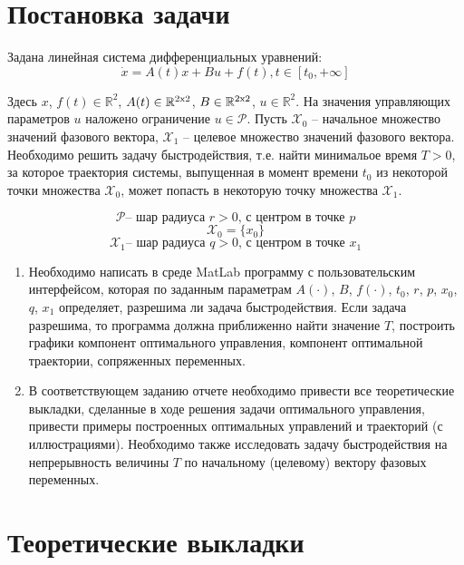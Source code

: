 \documentclass{article}
\begin{document}
\section{Постановка задачи}

    Задана линейная система дифференциальных уравнений:
    \begin{equation}
        \label{pz_1}
        \dot x = A(t)x+Bu + f(t), t \in [t_0, +\infty]
    \end{equation}

    Здесь $x$, $f(t) \in \mathbb{R}^2$, $A(t) \in \mathbb{R}^{\rm 2x2}$, $B \in \mathbb{R}^{\rm 2x2}$, $u \in \mathbb{R}^2$. На значения управляющих параметров $u$ наложено ограничение $u \in \mathcal{P}$. Пусть $\mathcal{X}_0$ -- начальное множество значений фазового вектора, $\mathcal{X}_1$ -- целевое множество значений фазового вектора. Необходимо решить задачу быстродействия, т.е. найти минимальое время ${T > 0}$, за которое траектория системы, выпущенная в момент времени $t_0$ из некоторой точки множества $\mathcal{X}_0$, может попасть в некоторую точку множества $\mathcal{X}_1$.

    $$\mathcal{P} \mbox{-- шар радиуса } {r > 0} \mbox{, с центром в точке } p$$
    $$\mathcal{X}_0 = \{x_0\}$$
    $$\mathcal{X}_1\mbox{-- шар радиуса } {q > 0} \mbox{, с центром в точке } x_1$$

    \begin{enumerate}
        \item Необходимо написать в среде MatLab программу с  пользовательским интерфейсом, которая по заданным параметрам $A(\cdot)$, $B$, $f(\cdot)$, $t_0$, $r$, $p$, $x_0$, $q$, $x_1$ определяет, разрешима ли задача быстродействия. Если задача  разрешима, то программа должна приближенно найти значение $T$, построить графики компонент оптимального управления, компонент оптимальной траектории, сопряженных переменных.
        \item В соответствующем заданию отчете необходимо привести все теоретические выкладки, сделанные в ходе решения задачи оптимального управления, привести примеры построенных оптимальных управлений и траекторий (с иллюстрациями).  Необходимо также исследовать задачу быстродействия на непрерывность величины $T$ по начальному (целевому) вектору фазовых переменных.
        \end{enumerate}

\newpage
\section{Теоретические выкладки}
\end{document}
